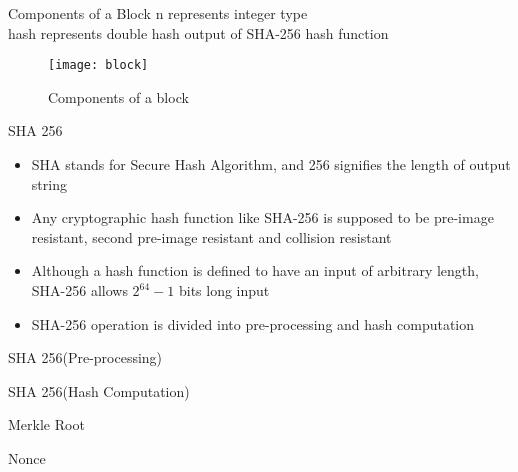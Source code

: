 \documentclass{beamer}
\begin{document}
\begin{frame}{Components of a Block}
n represents integer type \\
hash represents double hash output of SHA-256 hash function
\begin{figure}[H]\centering 
\texttt{[image: block]}
\caption{Components of a block}
\end{figure}
    
\end{frame}
\begin{frame}{SHA 256}
 \begin{itemize}
     \item SHA stands for Secure Hash Algorithm, and 256 signifies the length of output string
     \item Any cryptographic hash function like SHA-256 is supposed to be pre-image resistant, second pre-image resistant and collision resistant
     \item Although a hash function is defined to have an input of arbitrary length, SHA-256 allows $2^{64} - 1$ bits long input
     \item SHA-256 operation is divided into pre-processing and hash computation
 \end{itemize}   
\end{frame}
\begin{frame}{SHA 256(Pre-processing)}
    
\end{frame}
\begin{frame}{SHA 256(Hash Computation)}
    
\end{frame}
\begin{frame}{Merkle Root}
    
\end{frame}
\begin{frame}{Nonce}
    
\end{frame}



\end{document}
